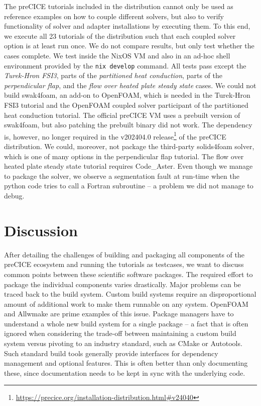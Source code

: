 \documentclass{eceasst}
\begin{document}
The preCICE tutorials included in the distribution cannot only be used as reference examples on how to couple different solvers, but also to verify functionality of solver and adapter installations by executing them.
To this end, we execute all 23 tutorials of the distribution such that each coupled solver option is at least run once. We do not compare results, but only test whether the cases complete.
We test inside the NixOS VM and also in an ad-hoc shell environment provided by the \texttt{nix develop} command. All tests pass except the \textit{Turek-Hron FSI3}, parts of the \textit{partitioned heat conduction}, parts of the \textit{perpendicular flap}, and the \textit{flow over heated plate steady state} cases.
We could not build swak4foam, an add-on to OpenFOAM, which is needed in the Turek-Hron FSI3 tutorial and the OpenFOAM coupled solver participant of the partitioned heat conduction tutorial.
The official preCICE VM uses a prebuilt version of swak4foam, but also patching the prebuilt binary did not work.
The dependency is, however, no longer required in the v202404.0 release\footnote{\url{https://precice.org/installation-distribution.html\#v24040}} of the preCICE distribution.
We could, moreover, not package the third-party solids4foam solver, which is one of many options in the perpendicular flap tutorial.
The flow over heated plate steady state tutorial requires Code\_Aster. Even though we manage to package the solver, we observe a segmentation fault at run-time when the python code tries to call a Fortran subroutine -- a problem we did not manage to debug.


\section{Discussion}
\label{sec:discussion}

After detailing the challenges of building and packaging all components of the preCICE ecosystem and running the tutorials as testcases, we want to discuss common points between these scientific software packages.
The required effort to package the individual components varies drastically. Major problems can be traced back to the build system.
Custom build systems require an disproportional amount of additional work to make them runnable on any system.
OpenFOAM and Allwmake are prime examples of this issue. Package managers have to understand a whole new build system for a single package -- a fact that is often ignored when considering the trade-off between maintaining a custom build system versus pivoting to an industry standard, such as CMake or Autotools.
Such standard build tools generally provide interfaces for dependency management and optional features. This is often better than only documenting these, since documentation needs to be kept in sync with the underlying code.
\end{document}
